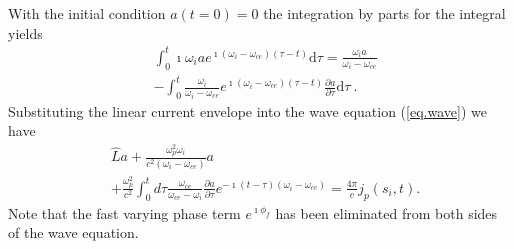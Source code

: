 With the initial condition  $a(t=0) = 0$ 
the integration by parts for the  integral 
yields
\begin{equation}
    \begin{aligned}
    &\int_0^t \imath\omega_i a e^{\imath  (\omega_i - \omega_{ce})(\tau-t)}\mathrm{d} \tau   = \frac{\omega_i a}{\omega_i - \omega_{ce}}
    \\
    &-\int_0^t \frac{\omega_i}{\omega_i - \omega_{ce}}  e^{\imath (\omega_i - \omega_{ce})(\tau-t)} \frac{\partial a}{\partial \tau}  \mathrm{d} \tau ~.
    \end{aligned}
\end{equation}
Substituting the  linear current envelope into the wave equation (\ref{eq.wave}) we have
\begin{equation}\label{eq.wave2}
    \begin{aligned}
    &  \hat{L} a+\frac{\omega_p^2 \omega_i}{c^2\left(\omega_i-\omega_{c e}\right)} a \\
    & +\frac{\omega_p^2}{c^2} \int_0^t d \tau \frac{\omega_{c e}}{\omega_{c e}-\omega_i} \frac{\partial a}{\partial \tau} e^{-\imath (t-\tau)\left(\omega_i-\omega_{c e}\right) } =\frac{4\pi}{c} j_{p}(s_i,t).
    \end{aligned}
\end{equation}
Note that the fast varying phase term $e^{\imath \phi_f}$ has been eliminated from both sides of the wave equation. 


